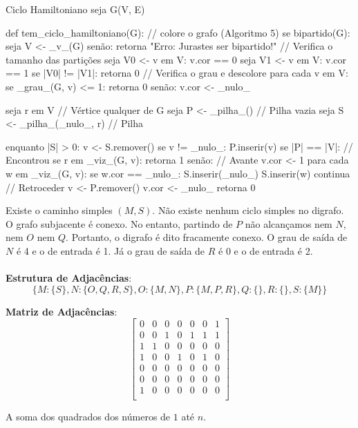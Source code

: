 \documentclass{homework}
\begin{document}
	\begin{algor}{Ciclo Hamiltoniano}
	seja G(V, E)
	
	def tem_ciclo_hamiltoniano(G):
		// colore o grafo (Algoritmo 5)
		se bipartido(G):
			seja V <- _v_(G)
		senão:
			retorna "Erro: Jurastes ser bipartido!"
		// Verifica o tamanho das partições
		seja V0 <- {v em V: v.cor == 0}
		seja V1 <- {v em V: v.cor == 1}
		se |V0| != |V1|:
			retorna 0
		// Verifica o grau e descolore
		para cada v em V:
			se _grau_(G, v) <= 1:
				retorna 0
			senão:
				v.cor <- _nulo_
		
		seja r em V // Vértice qualquer de G
		seja P <- _pilha_() // Pilha vazia
		seja S <- _pilha_({_nulo_, r}) // Pilha
	
		enquanto |S| > 0:
			v <- S.remover()
			se v != _nulo_:
				P.inserir(v)
				se |P| == |V|:
					// Encontrou
					se r em _viz_(G, v):
						retorna 1
				senão:
					// Avante
					v.cor <- 1
					para cada w em _viz_(G, v):
						se w.cor == _nulo_:
							S.inserir(_nulo_)
							S.inserir(w)
					continua
			// Retroceder
			v <- P.remover()
			v.cor <- _nulo_
		retorna 0
		
	\end{algor}
	\quest
	\subsubquest Existe o caminho simples $(M, S)$.
	\subsubquest Não existe nenhum ciclo simples no digrafo.
	\subsubquest O grafo subjacente é conexo. No entanto, partindo de $P$ não alcançamos nem $N$, nem $O$ nem $Q$. Portanto, o digrafo é dito fracamente conexo.
	\subsubquest O grau de saída de $N$ é 4 e o de entrada é 1. Já o grau de saída de $R$ é 0 e o de entrada é 2.
	\subsubquest \\\\
		\textbf{Estrutura de Adjacências}:
		$$\{M: \{S\}, N:\{O, Q, R, S\}, O:\{M, N\}, P:\{M, P, R\}, Q:\{\}, R:\{\}, S:\{M\}\}$$
		
		\textbf{Matriz de Adjacências}:
		$$\left[\begin{matrix}
		0 & 0 & 0 & 0 & 0 & 0 & 1\\
		0 & 0 & 1 & 0 & 1 & 1 & 1\\
		1 & 1 & 0 & 0 & 0 & 0 & 0\\
		1 & 0 & 0 & 1 & 0 & 1 & 0\\
		0 & 0 & 0 & 0 & 0 & 0 & 0\\
		0 & 0 & 0 & 0 & 0 & 0 & 0\\
		1 & 0 & 0 & 0 & 0 & 0 & 0\\
		\end{matrix}\right]$$
	
	\quest
	\subsubquest A soma dos quadrados dos números de $1$ até $n$.
	
\end{document}
